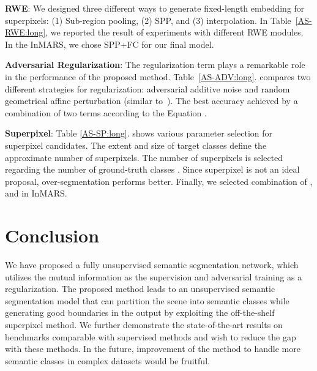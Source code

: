 \documentclass[letterpaper, 10 pt, journal, twoside]{IEEEtran}
\newcommand{\revised}{\textcolor{black}}{}
\begin{document}
\textbf{RWE}: 
We designed three different ways to generate fixed-length embedding for superpixels: (1) Sub-region pooling, (2) SPP, and (3) interpolation. 
In Table~\ref{AS-RWE:long}, we reported the result of experiments with different RWE modules. In the InMARS, we chose SPP+FC for our final model.\par

\textbf{Adversarial Regularization}: The regularization term plays a remarkable role in the performance of the proposed method. Table~\ref{AS-ADV:long}. compares two \revised{different} strategies for regularization: \revised{adversarial} additive noise and \revised{random geometrical} affine perturbation (similar to~\cite{IMSAT}). The best accuracy achieved by a combination of two terms according to the Equation .
  
\textbf{Superpixel}: Table \ref{AS-SP:long}. shows various parameter selection for superpixel candidates. The extent and size of target classes define the approximate number of superpixels. The number of superpixels is selected regarding the number of ground-truth classes . Since superpixel is not an ideal proposal, over-segmentation performs better. Finally, we selected combination of ,  and  in InMARS.\par






\section{Conclusion}
We have proposed a fully unsupervised semantic segmentation network, which utilizes the mutual information as the supervision and adversarial training as a regularization. The proposed method leads to an unsupervised semantic segmentation model that can partition the scene into semantic classes while generating good boundaries in the output by exploiting the off-the-shelf superpixel method. We further demonstrate the state-of-the-art results on benchmarks comparable with supervised methods and wish to reduce the gap with these methods. In the future, improvement of the method to handle more semantic classes in complex datasets would be fruitful.





























\ifCLASSOPTIONcaptionsoff
  \newpage
\fi









\end{document}
